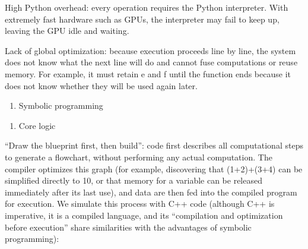 High Python overhead: every operation requires the Python interpreter. With extremely fast hardware such as GPUs, the interpreter may fail to keep up, leaving the GPU idle and waiting.

Lack of global optimization: because execution proceeds line by line, the system does not know what the next line will do and cannot fuse computations or reuse memory. For example, it must retain e and f until the function ends because it does not know whether they will be used again later.

\begin{enumerate}
\def\labelenumi{\arabic{enumi}.}
\setcounter{enumi}{1}
\tightlist
\item
  Symbolic programming
\end{enumerate}

\begin{enumerate}
\def\labelenumi{(\arabic{enumi})}
\tightlist
\item
  Core logic
\end{enumerate}

``Draw the blueprint first, then build'': code first describes all computational steps to generate a flowchart, without performing any actual computation. The compiler optimizes this graph (for example, discovering that (1+2)+(3+4) can be simplified directly to 10, or that memory for a variable can be released immediately after its last use), and data are then fed into the compiled program for execution. We simulate this process with C++ code (although C++ is imperative, it is a compiled language, and its ``compilation and optimization before execution'' share similarities with the advantages of symbolic programming):

